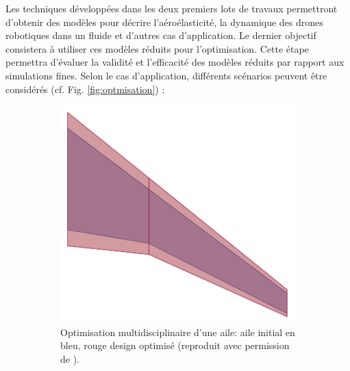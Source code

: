 \documentclass[12pt, french]{article}
\begin{document}
	Les techniques développées dans les deux premiers lots de travaux permettront d'obtenir des modèles pour décrire l'aéroélasticité, la dynamique des drones robotiques dans un fluide et d'autres cas d'application.
	Le dernier objectif consistera à utiliser ces modèles réduits pour l'optimisation. Cette étape permettra d'évaluer la validité et l'efficacité des modèles réduits par rapport aux simulations fines. Selon le cas d'application, différents scénarios peuvent être considérés (cf. Fig. \ref{fig:optmisation}) : 
	\begin{figure}[htb]
		\begin{subfigure}[t]{0.3\textwidth}
			\includegraphics[width=\columnwidth]{MDo_wing.png}%
			\caption{Optimisation multidisciplinaire d'une aile: aile initial en bleu, rouge design optimisé (reproduit avec permission de \cite{masColomer2021mdo}). }
			\label{fig:wing}
		\end{subfigure}\hfill
		\begin{subfigure}[t]{0.3\textwidth}

\end{subfigure}
\end{figure}
\end{document}

